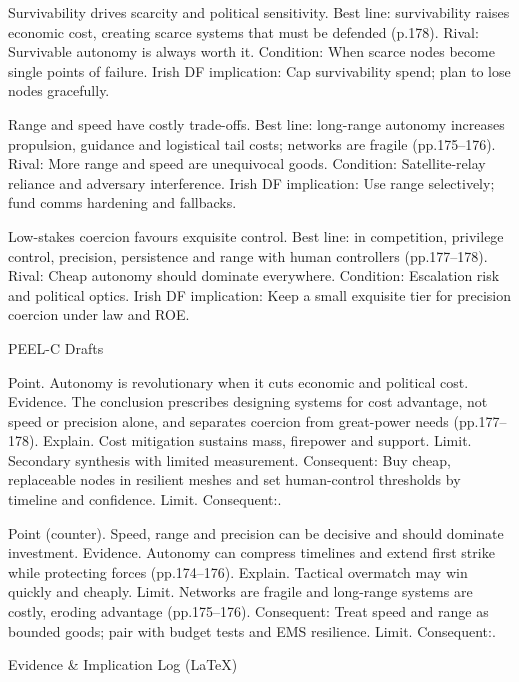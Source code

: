 Survivability drives scarcity and political sensitivity.
Best line: survivability raises economic cost, creating scarce systems that must be defended (p.178).
Rival: Survivable autonomy is always worth it.
Condition: When scarce nodes become single points of failure.
Irish DF implication: Cap survivability spend; plan to lose nodes gracefully.

Range and speed have costly trade-offs.
Best line: long-range autonomy increases propulsion, guidance and logistical tail costs; networks are fragile (pp.175–176).
Rival: More range and speed are unequivocal goods.
Condition: Satellite-relay reliance and adversary interference.
Irish DF implication: Use range selectively; fund comms hardening and fallbacks.

Low-stakes coercion favours exquisite control.
Best line: in competition, privilege control, precision, persistence and range with human controllers (pp.177–178).
Rival: Cheap autonomy should dominate everywhere.
Condition: Escalation risk and political optics.
Irish DF implication: Keep a small exquisite tier for precision coercion under law and ROE.

PEEL-C Drafts

Point. Autonomy is revolutionary when it cuts economic and political cost.
Evidence. The conclusion prescribes designing systems for cost advantage, not speed or precision alone, and separates coercion from great-power needs (pp.177–178).
Explain. Cost mitigation sustains mass, firepower and support.
Limit. Secondary synthesis with limited measurement. Consequent: Buy cheap, replaceable nodes in resilient meshes and set human-control thresholds by timeline and confidence. Limit. Consequent:.

Point (counter). Speed, range and precision can be decisive and should dominate investment.
Evidence. Autonomy can compress timelines and extend first strike while protecting forces (pp.174–176).
Explain. Tactical overmatch may win quickly and cheaply.
Limit. Networks are fragile and long-range systems are costly, eroding advantage (pp.175–176). Consequent: Treat speed and range as bounded goods; pair with budget tests and EMS resilience. Limit. Consequent:.

Evidence & Implication Log (LaTeX)

